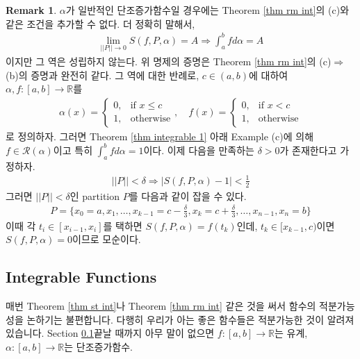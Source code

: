 \documentclass[12pt]{article}
\theoremstyle{definition}
\newtheorem*{rem}{Remark}
\def\RR{\mathbb{R}}
\def\calR{\mathcal{R}}
\newcommand{\abs}[1]{\left\vert#1\right\vert}
\newcommand{\norm}[1]{\left\vert\left\vert#1\right\vert\right\vert}
\begin{document}
\begin{rem}
	\(\alpha\)가 일반적인 단조증가함수일 경우에는 Theorem \ref{thm rm int}의 (c)와 같은 조건을 추가할 수 없다. 더 정확히 말해서,
	\begin{gather*}
		\lim_{\norm{P} \rightarrow 0} S(f, P, \alpha) = A \Longrightarrow \int_a^b f d\alpha = A
	\end{gather*}
	이지만 그 역은 성립하지 않는다. 위 명제의 증명은 Theorem \ref{thm rm int}의 (c)$\Rightarrow$(b)의 증명과 완전히 같다. 그 역에 대한 반례로, \(c \in (a, b)\)에 대하여 \(\alpha, f:[a, b] \rightarrow \RR\)를
	\begin{gather*}
		\alpha(x) =
		\begin{cases}
			0, &\text{if } x \le c\\
			1, &\text{otherwise}
		\end{cases}, \quad
		f(x) = 
		\begin{cases}
			0, &\text{if } x < c\\
			1, &\text{otherwise}
		\end{cases}
	\end{gather*}
	로 정의하자. 그러면 Theorem \ref{thm integrable 1} 아래 Example (c)에 의해 \(f \in \calR(\alpha)\)이고 특히 \(\int_a^b f d\alpha = 1\)이다. 이제 다음을 만족하는 \(\delta > 0\)가 존재한다고 가정하자.
	\begin{gather*}
		\norm{P} < \delta \Longrightarrow \abs{S(f, P, \alpha) - 1} < \frac{1}{2}
	\end{gather*}
	그러면 \(\norm{P} < \delta\)인 partition \(P\)를 다음과 같이 잡을 수 있다.
	\begin{gather*}
		P = \{x_0 = a, x_1, \ldots, x_{k-1} = c - \frac{\delta}{3}, x_{k} = c + \frac{\delta}{3}, \ldots, x_{n-1}, x_n = b\}
	\end{gather*}
	이때 각 \(t_i \in [x_{i-1}, x_i]\)를 택하면 \(S(f, P, \alpha) = f(t_k)\)인데, \(t_k \in [x_{k-1}, c)\)이면 \(S(f, P, \alpha) = 0\)이므로 모순이다.
\end{rem}

\subsection{Integrable Functions} \label{sec int ftn}

매번 Theorem \ref{thm st int}나 Theorem \ref{thm rm int} 같은 것을 써서 함수의 적분가능성을 논하기는 불편합니다. 다행히 우리가 아는 좋은 함수들은 적분가능한 것이 알려져 있습니다. Section \ref{sec int ftn}\가 끝날 때까지 아무 말이 없으면 \(f: [a, b] \rightarrow \RR\)는 유계, \(\alpha: [a, b] \rightarrow \RR\)는 단조증가함수.
\end{document}
